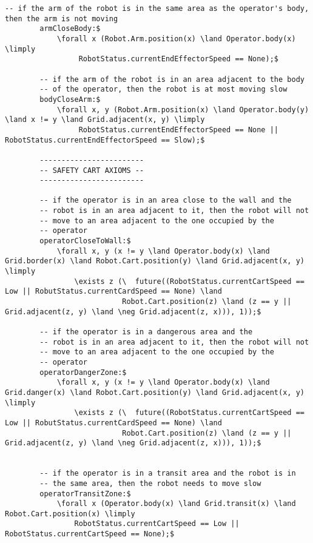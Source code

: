 \begin{lstlisting}[fontadjust, mathescape, frame=tlb]
        -- if the arm of the robot is in the same area as the operator's body, then the arm is not moving
        armCloseBody:$
            \forall x (Robot.Arm.position(x) \land Operator.body(x) \limply
                 RobotStatus.currentEndEffectorSpeed == None);$

        -- if the arm of the robot is in an area adjacent to the body
        -- of the operator, then the robot is at most moving slow
        bodyCloseArm:$
            \forall x, y (Robot.Arm.position(x) \land Operator.body(y) \land x != y \land Grid.adjacent(x, y) \limply
                 RobotStatus.currentEndEffectorSpeed == None || RobotStatus.currentEndEffectorSpeed == Slow);$

        ------------------------       
        -- SAFETY CART AXIOMS --
        ------------------------

        -- if the operator is in an area close to the wall and the
        -- robot is in an area adjacent to it, then the robot will not
        -- move to an area adjacent to the one occupied by the
        -- operator
        operatorCloseToWall:$
            \forall x, y (x != y \land Operator.body(x) \land Grid.border(x) \land Robot.Cart.position(y) \land Grid.adjacent(x, y) \limply
                \exists z (\  future((RobotStatus.currentCartSpeed == Low || RobutStatus.currentCardSpeed == None) \land
                           Robot.Cart.position(z) \land (z == y || Grid.adjacent(z, y) \land \neg Grid.adjacent(z, x))), 1));$

        -- if the operator is in a dangerous area and the
        -- robot is in an area adjacent to it, then the robot will not
        -- move to an area adjacent to the one occupied by the
        -- operator
        operatorDangerZone:$
            \forall x, y (x != y \land Operator.body(x) \land Grid.danger(x) \land Robot.Cart.position(y) \land Grid.adjacent(x, y) \limply
                \exists z (\  future((RobotStatus.currentCartSpeed == Low || RobutStatus.currentCardSpeed == None) \land
                           Robot.Cart.position(z) \land (z == y || Grid.adjacent(z, y) \land \neg Grid.adjacent(z, x))), 1));$


        -- if the operator is in a transit area and the robot is in
        -- the same area, then the robot needs to move slow
        operatorTransitZone:$
            \forall x (Operator.body(x) \land Grid.transit(x) \land Robot.Cart.position(x) \limply
                RobotStatus.currentCartSpeed == Low || RobotStatus.currentCartSpeed == None);$
                \end{lstlisting}